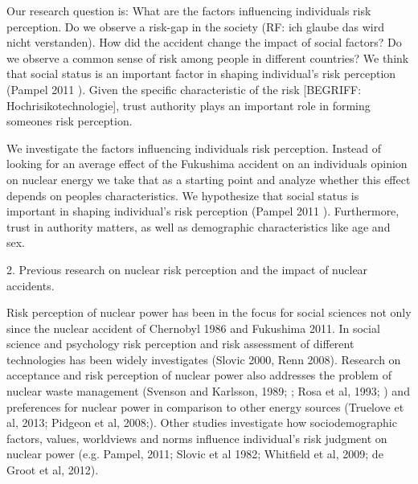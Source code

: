 Our research question is: What are the factors influencing individuals risk perception. Do we observe a risk-gap in the society (RF: ich glaube das wird nicht verstanden). How did the accident change the impact of social factors? Do we observe a common sense of risk among people in different countries? We think that social status is an important factor in shaping individual's risk perception (Pampel 2011 \citep{Pampel:2011cx}). Given the specific characteristic of the risk [BEGRIFF: Hochrisikotechnologie], trust authority plays an important role in forming someones risk perception. 

We investigate the factors influencing individuals risk perception. Instead of looking for an average effect of the Fukushima accident on an individuals opinion on nuclear energy we take that as a starting point and analyze whether this effect depends on peoples characteristics. We hypothesize that social status is important in shaping individual's risk perception (Pampel 2011 \citep{Pampel:2011cx}). Furthermore, trust in authority matters, as well as demographic characteristics like age and sex.


%


2. Previous research on nuclear risk perception and the impact of nuclear accidents.

Risk perception  of nuclear power has been in the focus for social sciences not only since the nuclear accident of Chernobyl 1986 and Fukushima 2011. In social science and psychology risk perception and risk assessment of different technologies has been widely investigates (Slovic 2000, Renn 2008). Research on acceptance and risk perception of nuclear power also addresses the problem of nuclear waste management (Svenson and Karlsson, 1989; \citep{Svenson:1989up}; Rosa et al, 1993;  ) and preferences for nuclear power in comparison to other energy sources (Truelove et al, 2013; Pidgeon et al, 2008;). Other studies investigate how sociodemographic factors, values, worldviews and norms influence individual's risk judgment on nuclear power (e.g. Pampel, 2011; Slovic et al 1982; Whitfield et al, 2009; de Groot et al, 2012). 
 
